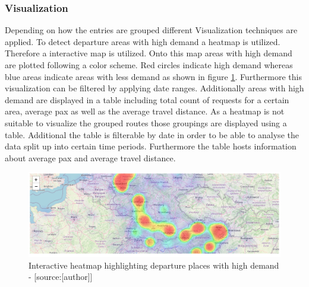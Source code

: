 \subsubsection{Visualization}
Depending on how the entries are grouped different Visualization techniques are applied. To detect departure areas with high demand a heatmap is utilized. Therefore a interactive map is utilized. Onto this map areas with high demand are plotted following a color scheme. Red circles indicate high demand whereas blue areas indicate areas with less demand as shown in figure \ref{fig:heatmap_dep}. Furthermore this visualization can be filtered by applying date ranges. Additionally areas with high demand are displayed in a table including total count of requests for a certain area, average pax as well as the average travel distance.
\newline
As a heatmap is not suitable to visualize the grouped routes those groupings are displayed using a table. Additional the table is filterable by date in order to be able to analyse the data split up into certain time periods. Furthermore the table hosts information about average pax and average travel distance. 
\begin{figure}[H]
	\centering
		\includegraphics[width=15cm]{images/heatmap_dep}
	\caption{Interactive heatmap highlighting departure places with high demand - [source:[author]]}
	\label{fig:heatmap_dep}
\end{figure}


